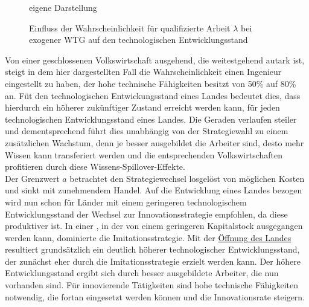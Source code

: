 	\begin{figure}[htbp] 
		\hfill{}  eigene Darstellung
		\caption{Einfluss der Wahrscheinlichkeit für qualifizierte Arbeit $\lambda$ bei exogener WTG auf den technologischen Entwicklungsstand}
		\label{lambdaExo}
	\end{figure}
%
Von einer geschlossenen Volkswirtschaft ausgehend, die weitestgehend autark ist, steigt in dem hier dargestellten Fall die Wahrscheinlichkeit einen Ingenieur eingestellt zu haben, der hohe technische Fähigkeiten besitzt von 50\% auf 80\% an. Füt den technologischen Entwickungsstand eines Landes bedeutet dies, dass hierdurch ein höherer zukünftiger Zustand erreicht werden kann, für jeden technologischen Entwicklungsstand eines Landes. Die Geraden verlaufen steiler und dementsprechend führt dies unabhängig von der Strategiewahl zu einem zusätzlichen Wachstum, denn je besser ausgebildet die Arbeiter sind, desto mehr Wissen kann transferiert werden und die entsprechenden Volkswirtschaften profitieren durch diese Wissens-Spillover-Effekte.\\ 
Der Grenzwert $\hat{a}$ betrachtet den Strategiewechsel losgelöst von möglichen Kosten und sinkt mit zunehmendem Handel. Auf die Entwicklung eines Landes bezogen wird nun schon für Länder mit einem geringeren technologischem Entwicklungsstand der Wechsel zur \textcolor[rgb]{0.74,0.97,0.22}{Innovationsstrategie} empfohlen, da diese produktiver ist. In einer , in der von einem geringeren Kapitalstock ausgegangen werden kann, dominierte die \textcolor[rgb]{0,0.32,0}{Imitationsstrategie}. Mit der \underline{Öffnung des Landes} resultiert grundsätzlich ein deutlich höherer technologischer Entwicklungsstand, der zunächst eher durch die \textcolor[rgb]{0,0.32,0}{Imitationsstrategie} erzielt werden kann.  Der höhere Entwicklungsstand ergibt sich durch besser ausgebildete Arbeiter, die nun vorhanden sind. Für innovierende Tätigkeiten sind hohe technische Fähigkeiten notwendig, die fortan eingesetzt werden können und die Innovationsrate steigern.\\
